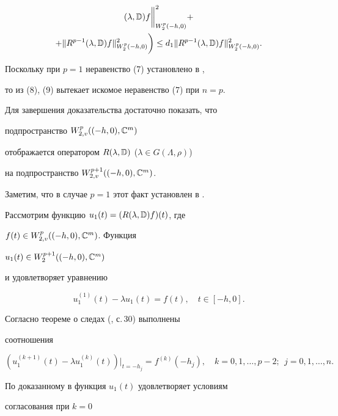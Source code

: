 \begin{pf}
\begin{multline}
(\lambda,\Bbb D)f\bigg\|^2_{W^p_2(-h,0)}+ \\ 


% 


+\|R^{p-1}(\lambda,\Bbb D)f\|^2_{W^p_2(-h,0)}\bigg)\le d_1 


\|R^{p-1}(\lambda,\Bbb D)f\|^2_{W^p_2(-h,0)}. 


\end{multline} 


Поскольку при $p=1$ неравенство (7) установлено в \cite{16}, 


то из (8), (9) вытекает искомое неравенство (7) при $n=p$. 


 


Для завершения доказательства достаточно показать, что 


подпространство $W^p_{2,v}((-h,0),\Bbb C^m)$ 


отображается оператором $R(\lambda,\Bbb D)$ ($\lambda\in G(\Lambda,\rho)$) 


на подпространство $W^{p+1}_{2,v}((-h,0),\Bbb C^m)$. 


Заметим, что в случае $p=1$ этот факт установлен в \cite{16}. 


 


Рассмотрим функцию $u_1(t)=(R(\lambda,\Bbb D)f)(t)$, где 


$f(t)\in W^p_{2,v}((-h,0),\Bbb C^m)$. Функция 


$u_1(t)\in W^{p+1}_2((-h,0),\Bbb C^m)$ 


и удовлетворяет уравнению 


$$ 


u^{(1)}_1(t)-\lambda u_1(t)=f(t),\quad t\in[-h,0]. 


$$ 


Согласно теореме о следах (\cite{13}, с.\,30) выполнены 


соотношения 


\begin{equation} 


(u^{(k+1)}_1(t)-\lambda u^{(k)}_1(t))|_{t=-h_j}= 


f^{(k)}(-h_j),\quad k=0,1,\dotsc,p-2;\ \ j=0,1,\dotsc,n. 


\end{equation} 


По доказанному в \cite{16} функция $u_1(t)$ удовлетворяет условиям 


согласования при $k=0$


\begin{equation} 



\end{equation}
\end{pf}
